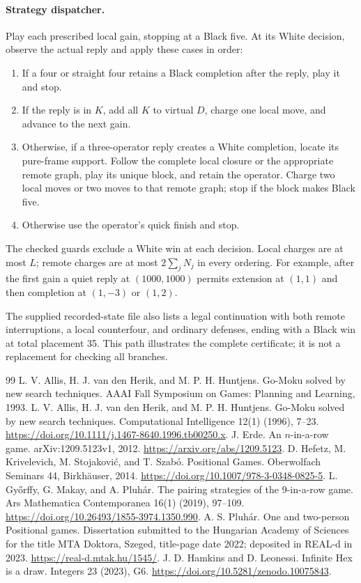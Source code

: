 \documentclass[11pt]{article}
\theoremstyle{definition}
\theoremstyle{remark}
\begin{document}
\paragraph{Strategy dispatcher.}
Play each prescribed local gain, stopping at a Black five. At its White
decision, observe the actual reply and apply these cases in order:
\begin{enumerate}\setlength{\itemsep}{0pt}\setlength{\parsep}{0pt}
\item If a four or straight four retains a Black completion after the reply,
play it and stop.
\item If the reply is in $K$, add all $K$ to virtual $D$, charge one local
move, and advance to the next gain.
\item Otherwise, if a three-operator reply creates a White completion,
locate its pure-frame support. Follow the complete local closure or the
appropriate remote graph, play its unique block, and retain the operator.
Charge two local moves or two moves to that remote graph; stop if the block
makes Black five.
\item Otherwise use the operator's quick finish and stop.
\end{enumerate}
The checked guards exclude a White win at each decision. Local charges
are at most $L$; remote charges are at most $2\sum_jN_j$ in every ordering.
For example, after the first gain a quiet reply at $(1000,1000)$ permits
extension at $(1,1)$ and then completion at $(1,-3)$ or $(1,2)$.

The supplied recorded-state file also lists a legal continuation with both
remote interruptions, a local counterfour, and ordinary defenses, ending
with a Black win at total placement 35. This path illustrates the complete
certificate; it is not a replacement for checking all branches.

\begin{thebibliography}{99}
\setlength{\itemsep}{0pt}\setlength{\parskip}{0pt}
 L. V. Allis, H. J. van den Herik, and M. P. H. Huntjens.
Go-Moku solved by new search techniques. AAAI Fall Symposium on Games:
Planning and Learning, 1993.
 L. V. Allis, H. J. van den Herik, and M. P. H. Huntjens.
Go-Moku solved by new search techniques. Computational Intelligence
12(1) (1996), 7--23.
\url{https://doi.org/10.1111/j.1467-8640.1996.tb00250.x}.
 J. Erde. An $n$-in-a-row game.
arXiv:1209.5123v1, 2012.
\url{https://arxiv.org/abs/1209.5123}.
 D. Hefetz, M. Krivelevich, M. Stojakovi\'c, and T. Szab\'o.
Positional Games. Oberwolfach Seminars 44, Birkh\"auser, 2014.
\url{https://doi.org/10.1007/978-3-0348-0825-5}.
 L. Gy\H{o}rffy, G. Makay, and A. Pluh\'ar.
The pairing strategies of the 9-in-a-row game.
Ars Mathematica Contemporanea 16(1) (2019), 97--109.
\url{https://doi.org/10.26493/1855-3974.1350.990}.
 A. S. Pluh\'ar. One and two-person Positional games.
Dissertation submitted to the Hungarian Academy of Sciences for the title
MTA Doktora, Szeged, title-page date 2022; deposited in REAL-d in 2023.
\url{https://real-d.mtak.hu/1545/}.
 J. D. Hamkins and D. Leonessi.
Infinite Hex is a draw. Integers 23 (2023), G6.
\url{https://doi.org/10.5281/zenodo.10075843}.
\end{thebibliography}
\end{document}
